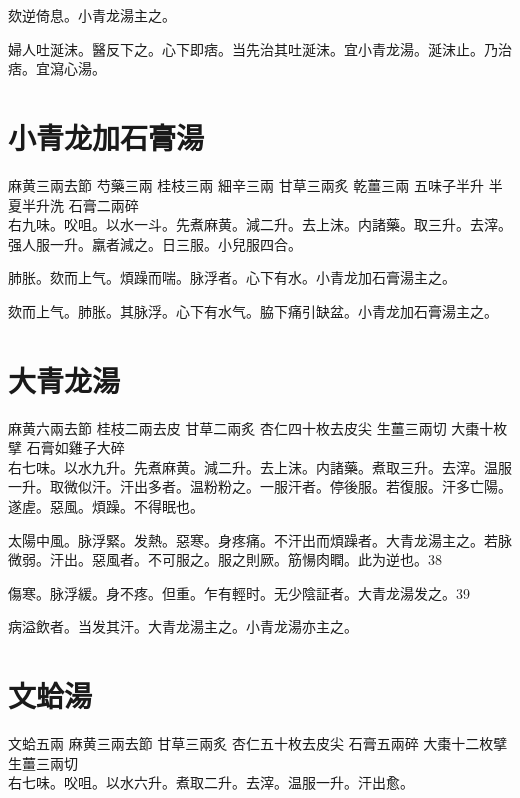 欬逆倚息。小青龙湯主之。

婦人吐涎沫。醫反下之。心下即痞。当先治其吐涎沫。宜小青龙湯。涎沫止。乃治痞。宜瀉心湯。

\section{小青龙加石膏湯}

麻黄{\scriptsize 三兩去節} 芍藥{\scriptsize 三兩} 桂枝{\scriptsize 三兩} 細辛{\scriptsize 三兩} 甘草{\scriptsize 三兩炙} 乾薑{\scriptsize 三兩} 五味子{\scriptsize 半升} 半夏{\scriptsize 半升洗} 石膏{\scriptsize 二兩碎}\\
右九味。㕮咀。以水一斗。先煮麻黄。減二升。去上沫。内諸藥。取三升。去滓。强人服一升。羸者減之。日三服。小兒服四合。

肺胀。欬而上气。煩躁而喘。脉浮者。心下有水。小青龙加石膏湯主之。

欬而上气。肺胀。其脉浮。心下有水气。脇下痛引缺盆。小青龙加石膏湯主之。

\section{大青龙湯}

麻黄{\scriptsize 六兩去節} 桂枝{\scriptsize 二兩去皮} 甘草{\scriptsize 二兩炙} 杏仁{\scriptsize 四十枚去皮尖} 生薑{\scriptsize 三兩切} 大棗{\scriptsize 十枚擘} 石膏{\scriptsize 如雞子大碎}\\
右七味。以水九升。先煮麻黄。減二升。去上沫。内諸藥。煮取三升。去滓。温服一升。取微似汗。汗出多者。温粉粉之。一服汗者。停後服。若復服。汗多亡陽。遂虗。惡風。煩躁。不得眠也。

太陽中風。脉浮緊。发熱。惡寒。身疼痛。不汗出而煩躁者。大青龙湯主之。若脉微弱。汗出。惡風者。不可服之。服之則厥。筋愓肉瞤。此为逆也。38

傷寒。脉浮緩。身不疼。但重。乍有輕时。无少陰証者。大青龙湯发之。39

病溢飲者。当发其汗。大青龙湯主之。小青龙湯亦主之。

\section{文蛤湯}

文蛤{\scriptsize 五兩} 麻黄{\scriptsize 三兩去節} 甘草{\scriptsize 三兩炙} 杏仁{\scriptsize 五十枚去皮尖} 石膏{\scriptsize 五兩碎} 大棗{\scriptsize 十二枚擘} 生薑{\scriptsize 三兩切}\\
右七味。㕮咀。以水六升。煮取二升。去滓。温服一升。汗出愈。

